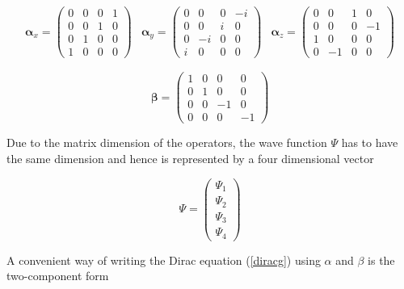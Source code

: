 \begin{equation}\begin{array}{lll}
\boldsymbol{\alpha}_x= \left(\begin{array}{cccc}
0 & 0 & 0 & 1\\
0 & 0 & 1 & 0\\
0 & 1 & 0 & 0\\
1 & 0 & 0 & 0\end{array}\right)&
\boldsymbol{\alpha}_y = \left(\begin{array}{cccc}
0 & 0 & 0 & -i\\
0 & 0 & i & 0\\
0 & -i& 0 & 0\\
i & 0 & 0 & 0\end{array}\right)&
\boldsymbol{\alpha}_z = \left(\begin{array}{cccc}
0 & 0 & 1 & 0\\
0 & 0 & 0 &-1\\
1 & 0 & 0 & 0\\
0 & -1& 0 & 0
\end{array}\right)
\end{array}\end{equation}

\begin{equation}
\boldsymbol{\beta} = \left(\begin{array}{cccc}
1 & 0 & 0 & 0\\
0 & 1 & 0 & 0\\
0 & 0 &-1 & 0\\
0 & 0 & 0 &-1
\end{array}\right)
\end{equation}


Due to the matrix dimension of the operators, the wave function $\Psi$ has to have
the same dimension and hence is represented by a four dimensional vector

\begin{equation}
\Psi = \begin{pmatrix}
\Psi_1\\\Psi_2\\\Psi_3\\\Psi_4
\end{pmatrix}
\end{equation}

A convenient way of writing the Dirac equation (\ref{diracg})
using $\alpha$ and $\beta$
is the two-component form

